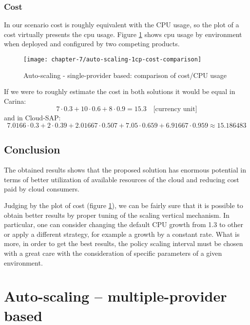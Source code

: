 \subsubsection*{Cost}
In our scenario cost is roughly equivalent with the CPU usage, so the plot of a cost virtually presents the cpu usage. Figure \ref{eval:auto-scaling-1cp-cost-comparison} shows cpu usage by environment when deployed and configured by two competing products.
\begin{figure}[!ht]
  \begin{center}
    \texttt{[image: chapter-7/auto-scaling-1cp-cost-comparison]}
  \end{center}
  \caption{Auto-scaling - single-provider based: comparison of cost/CPU usage}
  \label{eval:auto-scaling-1cp-cost-comparison}
\end{figure}
If we were to roughly estimate the cost in both solutions it would be equal in Carina:
\begin{equation}
  7\cdot 0.3 + 10\cdot 0.6 + 8\cdot 0.9 = 15.3 \quad \text{[currency unit]}
\end{equation}
and in Cloud-SAP:
\begin{equation}
  7.0166\cdot 0.3 + 2\cdot 0.39 + 2.01667\cdot0.507 + 7.05\cdot 0.659 + 6.91667\cdot 0.959 \approx 15.186483
\end{equation}

\subsection*{Conclusion}
The obtained results shows that the proposed solution has enormous potential in terms of better utilization of available resources of the cloud and reducing cost paid by cloud consumers.

Judging by the plot of cost (figure \ref{eval:auto-scaling-1cp-cost-comparison}), we can be fairly sure that it is possible to obtain better results by proper tuning of the scaling vertical mechanism. In particular, one can consider changing the default CPU growth from 1.3 to other or apply a different strategy, for example a growth by a constant rate. What is more, in order to get the best results, the policy scaling interval must be chosen with a great care with the consideration of specific parameters of a given environment.

\section{Auto-scaling -- multiple-provider based}
